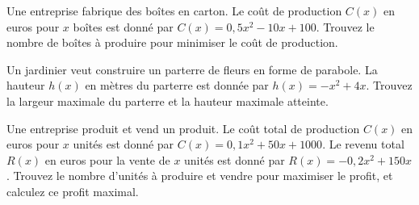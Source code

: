\documentclass[11pt,a4paper]{article}  %
\begin{document}
\exercice{}

Une entreprise fabrique des boîtes en carton. Le coût de production \( C(x) \) en euros pour \( x \) boîtes est donné par \( C(x) = 0,5x^2 - 10x + 100 \). Trouvez le nombre de boîtes à produire pour minimiser le coût de production.

%
%
%
%
%
%
%
%
%

\exercice{}

Un jardinier veut construire un parterre de fleurs en forme de parabole. La hauteur \( h(x) \) en mètres du parterre est donnée par \( h(x) = -x^2 + 4x \). Trouvez la largeur maximale du parterre et la hauteur maximale atteinte.


Une entreprise produit et vend un produit. Le coût total de production \( C(x) \) en euros pour \( x \) unités est donné par \( C(x) = 0,1x^2 + 50x + 1000 \). Le revenu total \( R(x) \) en euros pour la vente de \( x \) unités est donné par \( R(x) = -0,2x^2 + 150x \). Trouvez le nombre d'unités à produire et vendre pour maximiser le profit, et calculez ce profit maximal.

%
%
%
%
%
\end{document}
